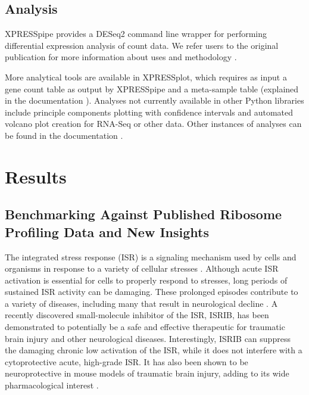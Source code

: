 \documentclass[10pt, oneside]{article}
\begin{document}
\subsection*{Analysis}
XPRESSpipe provides a DESeq2 command line wrapper for performing differential expression analysis of count data. We refer users to the original publication for more information about uses and methodology \cite{deseq2}.\par

More analytical tools are available in XPRESSplot, which requires as input a gene count table as output by XPRESSpipe and a meta-sample table (explained in the documentation \cite{xpressplot_docs}). Analyses not currently available in other Python libraries include principle components plotting with confidence intervals and automated volcano plot creation for RNA-Seq or other data. Other instances of analyses can be found in the documentation \cite{xpressplot_docs}.\\

\section*{Results}
\subsection*{Benchmarking Against Published Ribosome Profiling Data and New Insights}
The integrated stress response (ISR) is a signaling mechanism used by cells and organisms in response to a variety of cellular stresses \cite{harding_isr}. Although acute ISR activation is essential for cells to properly respond to stresses, long periods of sustained ISR activity can be damaging. These prolonged episodes contribute to a variety of diseases, including many that result in neurological decline \cite{isr_disease}. A recently discovered small-molecule inhibitor of the ISR, ISRIB, has been demonstrated to potentially be a safe and effective therapeutic for traumatic brain injury and other neurological diseases. Interestingly, ISRIB can suppress the damaging chronic low activation of the ISR, while it does not interfere with a cytoprotective acute, high-grade ISR. It has also been shown to be neuroprotective in mouse models of traumatic brain injury, adding to its wide pharmacological interest \cite{isrib_activation, isrib_structure, isrib_riboseq, isrib_neuroprotective, isrib_neuroprotective2, isrib_neuroprotective3, isrib_neuroprotective4}. \par
\end{document}

